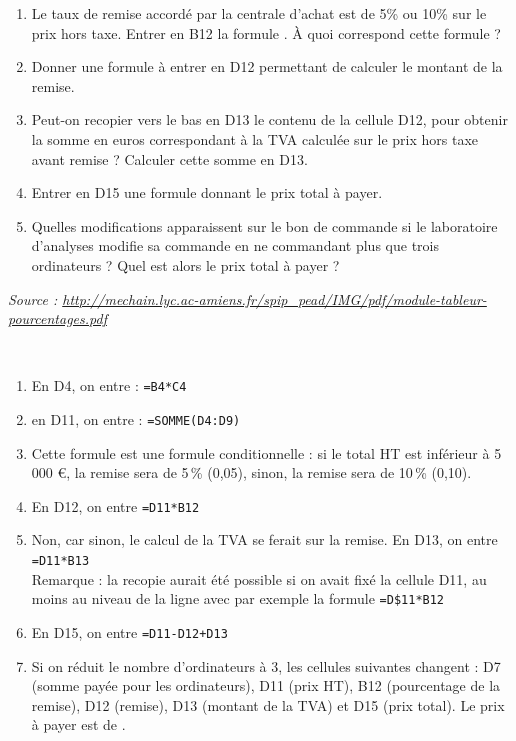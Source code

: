 \begin{exercice}
\begin{enumerate}
      \item Le taux de remise accordé par la centrale d'achat est de 5\% ou 10\% sur le prix hors taxe.
Entrer en B12 la formule . À quoi correspond cette formule ?
      \item Donner une formule à entrer en D12 permettant de calculer le montant de la remise.
      \item Peut-on recopier vers le bas en D13 le contenu de la cellule D12, pour obtenir la somme en euros correspondant à la TVA calculée sur le prix hors taxe avant remise ? Calculer cette somme en D13.
      \item Entrer en D15 une formule donnant le prix total à payer.
      \item Quelles modifications apparaissent sur le bon de commande si le laboratoire d'analyses modifie sa commande en ne commandant plus que trois ordinateurs ? Quel est alors le prix total à payer ?
   \end{enumerate}
   \hfill {\it\small Source : \url{http://mechain.lyc.ac-amiens.fr/spip_pead/IMG/pdf/module-tableur-pourcentages.pdf}}
\end{exercice}

\begin{corrige}
\ \\ [-5mm]
   \begin{enumerate}
      \item En D4, on entre : {\blue\texttt{=B4*C4}}
      \item en D11, on entre : {\blue\texttt{=SOMME(D4:D9)}}
      \item Cette formule est une formule conditionnelle : si le total HT est inférieur à 5 000 \euro, la remise sera de 5\,\% (0,05), sinon, la remise sera de 10\,\% (0,10).
      \item En D12, on entre {\blue\texttt{=D11*B12}}
      \item Non, car sinon, le calcul de la TVA se ferait sur la remise. En D13, on entre {\blue\texttt{=D11*B13}} \\
   Remarque : la recopie aurait été possible si on avait fixé la cellule D11, au moins au niveau de la ligne avec par exemple la formule {\blue\texttt{=D\$11*B12}} 
      \item En D15, on entre {\blue\texttt{=D11-D12+D13}}
      \item Si on réduit le nombre d'ordinateurs à 3, les cellules suivantes changent : D7 (somme payée pour les ordinateurs), D11 (prix HT), B12 (pourcentage de la remise), D12 (remise), D13 (montant de la TVA) et D15 (prix total). Le prix à payer est de {\blue {}}.
   \end{enumerate}
\end{corrige}

